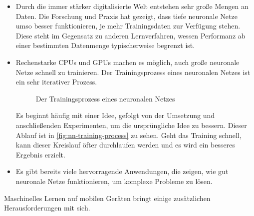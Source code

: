 \begin{itemize}
  \item Durch die immer stärker digitalisierte Welt
        entstehen sehr große Mengen an Daten.
        Die Forschung und Praxis hat gezeigt, dass tiefe neuronale Netze umso besser funktionieren,
        je mehr Trainingsdaten zur Verfügung stehen. Diese steht im Gegensatz
        zu anderen Lernverfahren, wessen Performanz ab einer bestimmten
        Datenmenge typischerweise begrenzt ist.
  \item Rechenstarke CPUs und GPUs machen es möglich, auch große neuronale Netze
        schnell zu trainieren. Der Trainingsprozess eines neuronalen
        Netzes ist ein sehr iterativer Prozess.
        \begin{figure}[!h]
          \centering
          
          \caption{Der Trainingsprozess eines neuronalen Netzes}
          \label{fig:nn-training-process}
        \end{figure}
        Es beginnt häufig mit einer Idee,
        gefolgt von der Umsetzung und anschließenden Experimenten, um die ursprüngliche
        Idee zu bessern.
        Dieser Ablauf ist in \autoref{fig:nn-training-process} zu sehen.
        Geht das Training schnell, kann dieser Kreislauf öfter durchlaufen
        werden und es wird ein besseres Ergebnis erzielt.
  \item Es gibt bereits viele hervorragende Anwendungen, die zeigen,
        wie gut neuronale Netze funktionieren, um komplexe Probleme zu lösen.
\end{itemize}
Maschinelles Lernen auf mobilen Geräten bringt einige
zusätzlichen Herausforderungen mit sich.